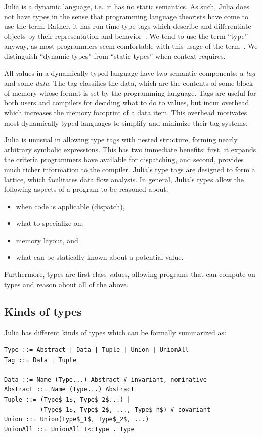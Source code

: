 \documentclass[10pt, preprint]{sigplanconf}
\begin{document}
Julia is a dynamic language, i.e.\ it has no static semantics. As such, Julia
does not have types in the sense that programming language theorists
have come to use the term.
Rather, it has run-time type tags which describe and differentiate objects by
their representation and behavior~\cite[Section 11.10, p. 142]{Pierce2002}.
We tend to use the term ``type'' anyway, as most programmers seem comfortable
with this usage of the term~\cite{Tratt2009,Kell2014}. We distinguish ``dynamic
types'' from ``static types'' when context requires.

All values in a dynamically typed language have two semantic components:
a \emph{tag} and some \emph{data}. The tag classifies the data, which are the
contents of some block of memory whose format is set by the programming
language. Tags are useful for both users and compilers for deciding what to do
to values, but incur overhead which increases the memory footprint of a data
item. This overhead motivates most dynamically typed languages to simplify and
minimize their tag systems.

Julia is unusual in allowing type tags with nested structure, forming nearly
arbitrary symbolic expressions. This has two immediate benefits: first,
it expands the criteria programmers have available for dispatching, and second,
provides much richer information to the compiler. Julia's type tags are designed
to form a lattice, which facilitates data flow analysis.
In general, Julia's types allow the following aspects of a program to be reasoned about:

\begin{itemize}
\item when code is applicable (dispatch),
\item what to specialize on,
\item memory layout, and
\item what can be statically known about a potential value.
\end{itemize}
%
Furthermore, types are first-class values, allowing programs that can compute
on types and reason about all of the above.

\subsection{Kinds of types}

Julia has different kinds of types which can be formally summarized as:

\begin{lstlisting}
Type ::= Abstract | Data | Tuple | Union | UnionAll
Tag ::= Data | Tuple

Data ::= Name (Type...) Abstract # invariant, nominative
Abstract ::= Name (Type...) Abstract
Tuple ::= (Type$_1$, Type$_2$...) |
          (Type$_1$, Type$_2$, ..., Type$_n$) # covariant
Union ::= Union(Type$_1$, Type$_2$, ...)
UnionAll ::= UnionAll T<:Type . Type
\end{lstlisting}
\end{document}
